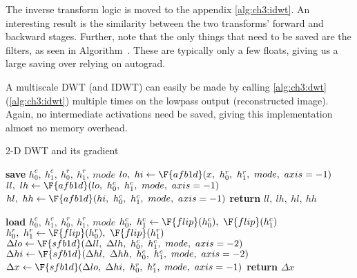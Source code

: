 The inverse transform logic is moved to the appendix
\autoref{alg:ch3:idwt}. An interesting result is the similarity between the two 
transforms' forward and backward stages. Further, note that the only things that
need to be saved are the filters, as seen in
Algorithm~. These are typically only a
few floats, giving us a large saving over relying on autograd.

A multiscale DWT (and IDWT) can easily be made by calling \autoref{alg:ch3:dwt}
(\autoref{alg:ch3:idwt}) multiple times on the lowpass output (reconstructed
image). Again, no intermediate activations need be saved, giving this
implementation almost no memory overhead. 

\begin{algorithm}[tb]
\caption{2-D DWT and its gradient}\label{alg:ch3:dwt}
\begin{algorithmic}[1]
  \State \textbf{save} $h_0^c,\ h_1^c,\ h_0^r,\ h_1^r,\ mode$  \label{line:ch3:dwt_save}
  \State $lo,\ hi \gets \F{afb1d}(x,\ h_0^r,\ h_1^r,\ mode,\ axis=-1)$ 
  \State $ll,\ lh \gets \F{afb1d}(lo,\ h_0^c,\ h_1^c,\ mode,\ axis=-1)$ 
  \State $hl,\ hh \gets \F{afb1d}(hi,\ h_0^c,\ h_1^c,\ mode,\ axis=-1)$ 
  \State \textbf{return} $ll,\ lh,\ hl,\ hh$
\EndFunction
\end{algorithmic}\vspace{10pt}
\begin{algorithmic}[1]
  \State \textbf{load} $h_0^c,\ h_1^c,\ h_0^r,\ h_1^r,\ mode$
  \State $ h_0^c,\ h_1^c \gets \F{flip}(h_0^c),\ \F{flip}(h_1^c) $
  \State $ h_0^r,\ h_1^r \gets \F{flip}(h_0^r),\ \F{flip}(h_1^r)$ 
  \State $\Delta lo \gets \F{sfb1d}(\Delta ll,\ \Delta lh,\ h_0^c,\ h_1^c,\ mode,\ axis=-2) $
  \State $\Delta hi \gets \F{sfb1d}(\Delta hl,\ \Delta hh,\ h_0^c,\ h_1^c,\ mode,\ axis=-2) $
  \State $\Delta x \gets \F{sfb1d}(\Delta lo,\ \Delta hi,\ h_0^r,\ h_1^r,\ mode,\ axis=-1) $
  \State \textbf{return} $\Delta x$
\EndFunction
\end{algorithmic}
\end{algorithm}


